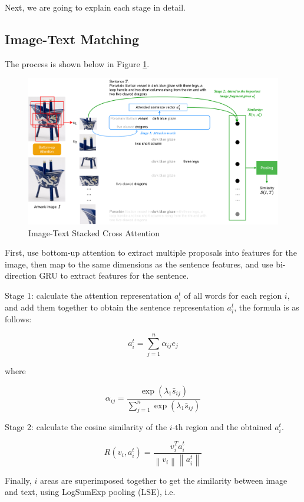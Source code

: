 Next, we are going to explain each stage in detail.

\subsection{Image-Text Matching}

The process is shown below in Figure \ref{fig:scan1}.

\begin{figure}[h!]
\centering
\includegraphics[width=1\textwidth]{scan1.pdf}
\caption{Image-Text Stacked Cross Attention}
\label{fig:scan1}
\end{figure}

First, use bottom-up attention \cite{bottomup} to extract multiple proposals into features for the image, then map to the same dimensions as the sentence features, and use bi-direction GRU to extract features for the sentence.

Stage 1: calculate the attention representation $a_{i}^{t}$ of all words for each region $i$, and add them together to obtain the sentence representation $a_{i}^{t}$, the formula is as follows:

$$
a_{i}^{t}=\sum_{j=1}^{n} \alpha_{i j} e_{j}
$$

where

$$
\alpha_{i j}=\frac{\exp \left(\lambda_{1} \bar{s}_{i j}\right)}{\sum_{j=1}^{n} \exp \left(\lambda_{1} \bar{s}_{i j}\right)}
$$

Stage 2: calculate the cosine similarity of the $i$-th region and the obtained $a_{i}^{t}$.

$$
R\left(v_{i}, a_{i}^{t}\right)=\frac{v_{i}^{T} a_{i}^{t}}{\left\|v_{i}\right\|\left\|a_{i}^{t}\right\|}
$$

Finally, $i$ areas are superimposed together to get the similarity between image and text, using LogSumExp pooling (LSE), i.e.

